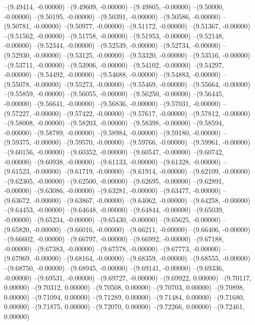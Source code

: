 --(9.49414, -0.00000)
--(9.49609, -0.00000)
--(9.49805, -0.00000)
--(9.50000, -0.00000)
--(9.50195, -0.00000)
--(9.50391, -0.00000)
--(9.50586, -0.00000)
--(9.50781, -0.00000)
--(9.50977, -0.00000)
--(9.51172, -0.00000)
--(9.51367, -0.00000)
--(9.51562, -0.00000)
--(9.51758, -0.00000)
--(9.51953, -0.00000)
--(9.52148, -0.00000)
--(9.52344, -0.00000)
--(9.52539, -0.00000)
--(9.52734, -0.00000)
--(9.52930, -0.00000)
--(9.53125, -0.00000)
--(9.53320, -0.00000)
--(9.53516, -0.00000)
--(9.53711, -0.00000)
--(9.53906, -0.00000)
--(9.54102, -0.00000)
--(9.54297, -0.00000)
--(9.54492, -0.00000)
--(9.54688, -0.00000)
--(9.54883, -0.00000)
--(9.55078, -0.00000)
--(9.55273, -0.00000)
--(9.55469, -0.00000)
--(9.55664, -0.00000)
--(9.55859, -0.00000)
--(9.56055, -0.00000)
--(9.56250, -0.00000)
--(9.56445, -0.00000)
--(9.56641, -0.00000)
--(9.56836, -0.00000)
--(9.57031, -0.00000)
--(9.57227, -0.00000)
--(9.57422, -0.00000)
--(9.57617, -0.00000)
--(9.57812, -0.00000)
--(9.58008, -0.00000)
--(9.58203, -0.00000)
--(9.58398, -0.00000)
--(9.58594, -0.00000)
--(9.58789, -0.00000)
--(9.58984, -0.00000)
--(9.59180, -0.00000)
--(9.59375, -0.00000)
--(9.59570, -0.00000)
--(9.59766, -0.00000)
--(9.59961, -0.00000)
--(9.60156, -0.00000)
--(9.60352, -0.00000)
--(9.60547, -0.00000)
--(9.60742, -0.00000)
--(9.60938, -0.00000)
--(9.61133, -0.00000)
--(9.61328, -0.00000)
--(9.61523, -0.00000)
--(9.61719, -0.00000)
--(9.61914, -0.00000)
--(9.62109, -0.00000)
--(9.62305, -0.00000)
--(9.62500, -0.00000)
--(9.62695, -0.00000)
--(9.62891, -0.00000)
--(9.63086, -0.00000)
--(9.63281, -0.00000)
--(9.63477, -0.00000)
--(9.63672, -0.00000)
--(9.63867, -0.00000)
--(9.64062, -0.00000)
--(9.64258, -0.00000)
--(9.64453, -0.00000)
--(9.64648, -0.00000)
--(9.64844, -0.00000)
--(9.65039, -0.00000)
--(9.65234, -0.00000)
--(9.65430, -0.00000)
--(9.65625, -0.00000)
--(9.65820, -0.00000)
--(9.66016, -0.00000)
--(9.66211, -0.00000)
--(9.66406, -0.00000)
--(9.66602, -0.00000)
--(9.66797, -0.00000)
--(9.66992, -0.00000)
--(9.67188, -0.00000)
--(9.67383, -0.00000)
--(9.67578, -0.00000)
--(9.67773, -0.00000)
--(9.67969, -0.00000)
--(9.68164, -0.00000)
--(9.68359, -0.00000)
--(9.68555, -0.00000)
--(9.68750, -0.00000)
--(9.68945, -0.00000)
--(9.69141, -0.00000)
--(9.69336, -0.00000)
--(9.69531, -0.00000)
--(9.69727, -0.00000)
--(9.69922, 0.00000)
--(9.70117, 0.00000)
--(9.70312, 0.00000)
--(9.70508, 0.00000)
--(9.70703, 0.00000)
--(9.70898, 0.00000)
--(9.71094, 0.00000)
--(9.71289, 0.00000)
--(9.71484, 0.00000)
--(9.71680, 0.00000)
--(9.71875, 0.00000)
--(9.72070, 0.00000)
--(9.72266, 0.00000)
--(9.72461, 0.00000)
